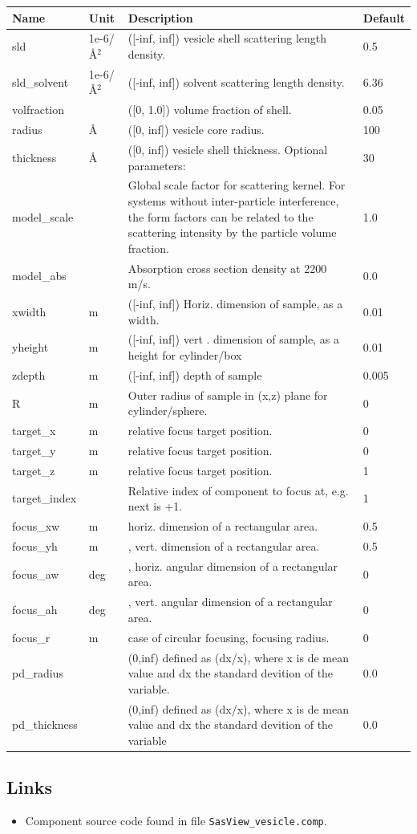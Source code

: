 \begin{longtable}{p{}p{}p{}p{}}
\toprule
\textbf{Name} & \textbf{Unit} & \textbf{Description} & \textbf{Default} \\
\midrule
\endhead
sld & 1e-6/\AA{}$^{2}$ & ([-inf, inf]) vesicle shell scattering length density. & 0.5 \\
sld\_solvent & 1e-6/\AA{}$^{2}$ & ([-inf, inf]) solvent scattering length density. & 6.36 \\
volfraction &  & ([0, 1.0]) volume fraction of shell. & 0.05 \\
radius & \AA{} & ([0, inf]) vesicle core radius. & 100 \\
thickness & \AA{} & ([0, inf]) vesicle shell thickness. Optional parameters: & 30 \\
model\_scale &   & Global scale factor for scattering kernel. For systems without inter-particle interference, the form factors can be related to the scattering intensity by the particle volume fraction. & 1.0 \\
model\_abs &   & Absorption cross section density at 2200 m/s. & 0.0 \\
xwidth & m & ([-inf, inf]) Horiz. dimension of sample, as a width. & 0.01 \\
yheight & m & ([-inf, inf]) vert . dimension of sample, as a height for cylinder/box & 0.01 \\
zdepth & m & ([-inf, inf]) depth of sample & 0.005 \\
R & m & Outer radius of sample in (x,z) plane for cylinder/sphere. & 0 \\
target\_x & m & relative focus target position. & 0 \\
target\_y & m & relative focus target position. & 0 \\
target\_z & m & relative focus target position. & 1 \\
target\_index &   & Relative index of component to focus at, e.g. next is +1. & 1 \\
focus\_xw & m & horiz. dimension of a rectangular area. & 0.5 \\
focus\_yh & m & , vert. dimension of a rectangular area. & 0.5 \\
focus\_aw & deg & , horiz. angular dimension of a rectangular area. & 0 \\
focus\_ah & deg & , vert. angular dimension of a rectangular area. & 0 \\
focus\_r & m & case of circular focusing, focusing radius. & 0 \\
pd\_radius &  & (0,inf) defined as (dx/x), where x is de mean value and dx the standard devition of the variable. & 0.0 \\
pd\_thickness &  & (0,inf) defined as (dx/x), where x is de mean value and dx the standard devition of the variable & 0.0 \\
\bottomrule
\end{longtable}

\subsection*{Links}
\begin{itemize}
  \item Component source code found in file \texttt{SasView\_vesicle.comp}.
\end{itemize}
